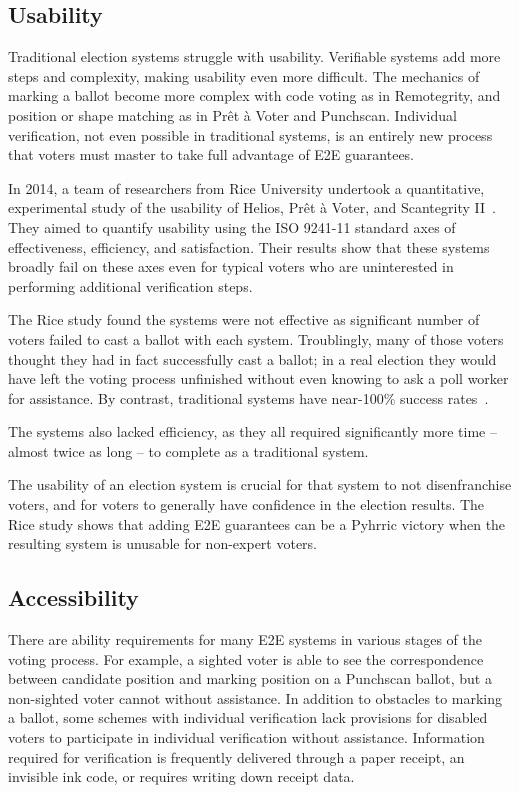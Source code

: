 \subsection{Usability}

Traditional election systems struggle with usability. Verifiable
systems add more steps and complexity, making usability even more
difficult. The mechanics of marking a ballot become more complex with
code voting as in Remotegrity, and position or shape matching as in
Prêt à Voter and Punchscan. Individual verification, not even possible
in traditional systems, is an entirely new process that voters must
master to take full advantage of E2E guarantees.

In 2014, a team of researchers from Rice University undertook a
quantitative, experimental study of the usability of Helios, Prêt à
Voter, and Scantegrity II~\cite{acemyan2014usability}. They aimed to
quantify usability using the ISO 9241-11 standard axes of
effectiveness, efficiency, and satisfaction. Their results show that
these systems broadly fail on these axes even for typical voters who
are uninterested in performing additional verification steps.

The Rice study found the systems were not effective as significant
number of voters failed to cast a ballot with each
system. Troublingly, many of those voters thought they had in fact
successfully cast a ballot; in a real election they would have left
the voting process unfinished without even knowing to ask a poll
worker for assistance. By contrast, traditional systems have
near-100\% success rates~\cite{byrne2007usability}.

The systems also lacked efficiency, as they all required significantly
more time -- almost twice as long -- to complete as a traditional
system.

The usability of an election system is crucial for that system to not
disenfranchise voters, and for voters to generally have confidence in
the election results. The Rice study shows that adding E2E guarantees
can be a Pyhrric victory when the resulting system is unusable for
non-expert voters.

\subsection{Accessibility}

There are ability requirements for many E2E systems in various stages
of the voting process. For example, a sighted voter is able to see the
correspondence between candidate position and marking position on a
Punchscan ballot, but a non-sighted voter cannot without
assistance. In addition to obstacles to marking a ballot, some schemes with
individual verification lack provisions for disabled voters to
participate in individual verification without assistance. Information
required for verification is frequently delivered through a paper
receipt, an invisible ink code, or requires writing down receipt
data.

